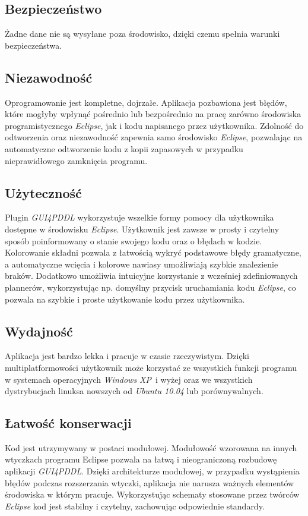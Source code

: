 \subsection*{Bezpieczeństwo}
Żadne dane nie są wysyłane poza środowisko, dzięki czemu spełnia warunki bezpieczeństwa.
\subsection*{Niezawodność}
Oprogramowanie jest kompletne, dojrzałe. Aplikacja pozbawiona jest błędów, które mogłyby wpłynąć pośrednio lub bezpośrednio na pracę zarówno środowiska programistycznego \emph{Eclipse}, jak i kodu napisanego przez użytkownika. Zdolność do odtworzenia oraz niezawodność zapewnia samo środowisko \emph{Eclipse}, pozwalając na automatyczne odtworzenie kodu z kopii zapasowych w przypadku nieprawidłowego zamknięcia programu.
\subsection*{Użyteczność}
Plugin \emph{GUI4PDDL} wykorzystuje wszelkie formy pomocy dla użytkownika dostępne w środowisku \emph{Eclipse}. Użytkownik jest zawsze w prosty i czytelny sposób poinformowany o stanie swojego kodu oraz o błędach w kodzie. Kolorowanie składni pozwala z łatwością wykryć podstawowe błędy gramatyczne, a automatyczne wcięcia i kolorowe nawiasy umożliwiają szybkie znalezienie braków. Dodatkowo umożliwia intuicyjne korzystanie z wcześniej zdefiniowanych plannerów, wykorzystując np. domyślny przycisk uruchamiania kodu \emph{Eclipse}, co pozwala na szybkie i proste użytkowanie kodu przez użytkownika.
\subsection*{Wydajność}
Aplikacja jest bardzo lekka i pracuje w czasie rzeczywistym. Dzięki multiplatformowości użytkownik może korzystać ze wszystkich funkcji programu w systemach operacyjnych \emph{Windows XP}\ i wyżej oraz we wszystkich dystrybucjach linuksa nowszych od \emph{Ubuntu 10.04} lub porównywalnych.
\subsection*{Łatwość konserwacji}
Kod jest utrzymywany w postaci modułowej. Modułowość wzorowana na innych wtyczkach programu Eclipse pozwala na łatwą i nieograniczoną rozbudowę aplikacji \emph{GUI4PDDL}. Dzięki architekturze modułowej, w przypadku wystąpienia błędów podczas rozszerzania wtyczki, aplikacja nie narusza ważnych elementów środowiska w którym pracuje. Wykorzystując schematy stosowane przez twórców \emph{Eclipse} kod jest stabilny i czytelny, zachowując odpowiednie standardy.


